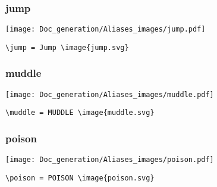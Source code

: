 \documentclass{article}
\begin{document}
\subsubsection{jump}
\begin{minipage}{0.45\linewidth}
\raggedright
\begin{spverbatim}
\jump 
\end{spverbatim}
\end{minipage}
\begin{minipage}{0.45\linewidth}
\raggedleft
\texttt{[image: Doc\_generation/Aliases\_images/jump.pdf]}
\end{minipage}
\begin{center}
\begin{BVerbatim}
\jump = Jump \image{jump.svg}
\end{BVerbatim}
\end{center}

\subsubsection{muddle}
\begin{minipage}{0.45\linewidth}
\raggedright
\begin{spverbatim}
\muddle 
\end{spverbatim}
\end{minipage}
\begin{minipage}{0.45\linewidth}
\raggedleft
\texttt{[image: Doc\_generation/Aliases\_images/muddle.pdf]}
\end{minipage}
\begin{center}
\begin{BVerbatim}
\muddle = MUDDLE \image{muddle.svg}
\end{BVerbatim}
\end{center}

\subsubsection{poison}
\begin{minipage}{0.45\linewidth}
\raggedright
\begin{spverbatim}
\poison 
\end{spverbatim}
\end{minipage}
\begin{minipage}{0.45\linewidth}
\raggedleft
\texttt{[image: Doc\_generation/Aliases\_images/poison.pdf]}
\end{minipage}
\begin{center}
\begin{BVerbatim}
\poison = POISON \image{poison.svg}
\end{BVerbatim}
\end{center}
\end{document}
